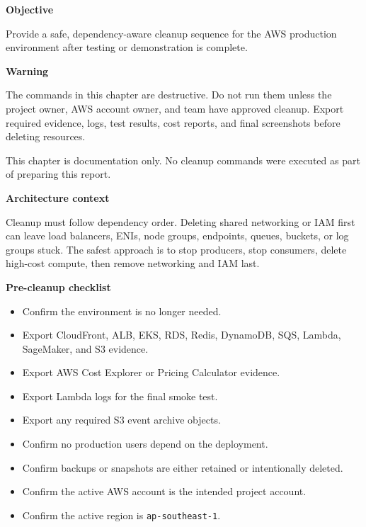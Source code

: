 \vspace{0.5em}\noindent\textbf{Objective}\par

Provide a safe, dependency-aware cleanup sequence for the AWS production
environment after testing or demonstration is complete.

\vspace{0.5em}\noindent\textbf{Warning}\par

The commands in this chapter are destructive. Do not run them unless the
project owner, AWS account owner, and team have approved cleanup. Export
required evidence, logs, test results, cost reports, and final
screenshots before deleting resources.

This chapter is documentation only. No cleanup commands were executed as
part of preparing this report.

\vspace{0.5em}\noindent\textbf{Architecture context}\par

Cleanup must follow dependency order. Deleting shared networking or IAM
first can leave load balancers, ENIs, node groups, endpoints, queues,
buckets, or log groups stuck. The safest approach is to stop producers,
stop consumers, delete high-cost compute, then remove networking and IAM
last.

\vspace{0.5em}\noindent\textbf{Pre-cleanup checklist}\par

\begin{itemize}
\tightlist
\item[$\square$]
  Confirm the environment is no longer needed.
\item[$\square$]
  Export CloudFront, ALB, EKS, RDS, Redis, DynamoDB, SQS, Lambda,
  SageMaker, and S3 evidence.
\item[$\square$]
  Export AWS Cost Explorer or Pricing Calculator evidence.
\item[$\square$]
  Export Lambda logs for the final smoke test.
\item[$\square$]
  Export any required S3 event archive objects.
\item[$\square$]
  Confirm no production users depend on the deployment.
\item[$\square$]
  Confirm backups or snapshots are either retained or intentionally
  deleted.
\item[$\square$]
  Confirm the active AWS account is the intended project account.
\item[$\square$]
  Confirm the active region is \texttt{ap-\allowbreak{}southeast-\allowbreak{}1}.
\end{itemize}


